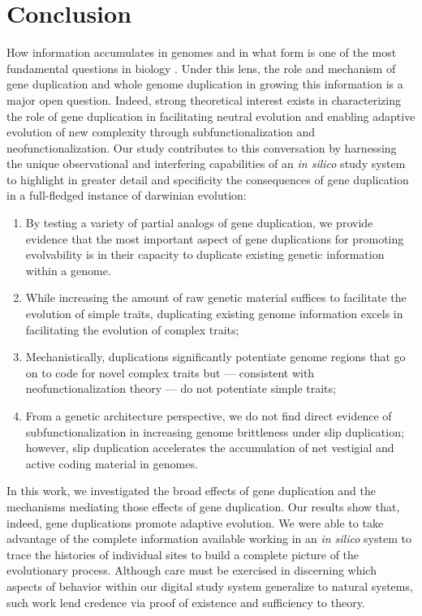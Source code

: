 \section{Conclusion} \label{sec:conclusion}

How information accumulates in genomes and in what form is one of the most fundamental questions in biology \citep{adami2024evolution}.
Under this lens, the role and mechanism of gene duplication and whole genome duplication in growing this information is a major open question.
Indeed, strong theoretical interest exists in characterizing the role of gene duplication in facilitating neutral evolution and enabling adaptive evolution of new complexity through subfunctionalization and neofunctionalization.
Our study contributes to this conversation by harnessing the unique observational and interfering capabilities of an \textit{in silico} study system to highlight in greater detail and specificity the consequences of gene duplication in a full-fledged instance of darwinian evolution:
\begin{enumerate}
\item By testing a variety of partial analogs of gene duplication, we provide evidence that the most important aspect of gene duplications for promoting evolvability is in their capacity to duplicate existing genetic information within a genome.
\item While increasing the amount of raw genetic material suffices to facilitate the evolution of simple traits, duplicating existing genome information excels in facilitating the evolution of complex traits;
\item Mechanistically, duplications significantly potentiate genome regions that go on to code for novel complex traits but --- consistent with neofunctionalization theory --- do not potentiate simple traits;
\item From a genetic architecture perspective, we do not find direct evidence of subfunctionalization in increasing genome brittleness under slip duplication; however, slip duplication accelerates the accumulation of net vestigial and active coding material in genomes.
\end{enumerate}

In this work, we investigated the broad effects of gene duplication and the mechanisms mediating those effects of gene duplication.
Our results show that, indeed, gene duplications promote adaptive evolution.
We were able to take advantage of the complete information available working in an \textit{in silico} system to trace the histories of individual sites to build a complete picture of the evolutionary process.
Although care must be exercised in discerning which aspects of behavior within our digital study system generalize to natural systems, such work lend credence via proof of existence and sufficiency to theory.

